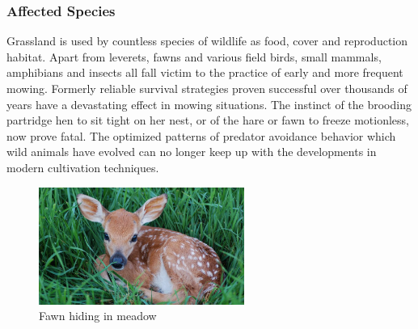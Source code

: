 \subsubsection{Affected Species} %
\label{ssub:affected_species}
Grassland is used by countless species of wildlife as food, cover and reproduction habitat. Apart from leverets, fawns and various field birds, small mammals, amphibians and insects all fall victim to the practice of early and more frequent mowing. Formerly reliable survival strategies proven successful over thousands of years have a devastating effect in mowing situations. The instinct of the brooding partridge hen to sit tight on her nest, or of the hare or fawn to freeze motionless, now prove fatal. The optimized patterns of predator avoidance behavior which wild animals have evolved can no longer keep up with the developments in modern cultivation techniques.
\begin{figure}[ht]
    \centering
    \includegraphics[width=0.6\textwidth]{figures/C1/fawns.jpeg}
    \caption{Fawn hiding in meadow}
    \label{fig:}
\end{figure}



